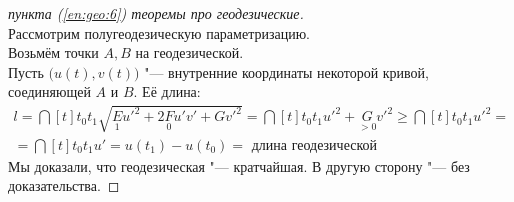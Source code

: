 \begin{proof}[пункта (\ref{en:geo:6}) теоремы про геодезические]
	\hfill \\
	Рассмотрим полугеодезическую параметризацию. \\
	Возьмём точки $ A, B $ на геодезической. \\
	Пусть $ \big( u(t), v(t) \big) $ "--- внутренние координаты некоторой кривой, соединяющей $ A $ и $ B $. Её длина:
	\begin{multline*}
		l = \dint[t]{t_0}{t_1}{\sqrt{\underset1Eu'^2 + 2\underset0Fu'v' + Gv'^2}} = \dint[t]{t_0}{t_1}{u'^2 + \underset{> 0}Gv'^2} \ge \dint[t]{t_0}{t_1}{u'^2} = \\
		= \dint[t]{t_0}{t_1}{u'} = u(t_1) - u(t_0) = \text{ длина геодезической}
	\end{multline*}
	Мы доказали, что геодезическая "--- кратчайшая. В другую сторону "--- без доказательства.
\end{proof}
